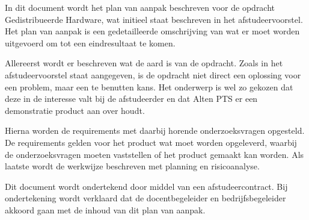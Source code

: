 \documentclass{../local}
\begin{document}
In dit document wordt het plan van aanpak beschreven voor de opdracht Gedistribueerde Hardware, wat initieel staat beschreven in het afstudeervoorstel. Het plan van aanpak is een gedetailleerde omschrijving van wat er moet worden uitgevoerd om tot een eindresultaat te komen.

Allereerst wordt er beschreven wat de aard is van de opdracht. Zoals in het afstudeervoorstel staat aangegeven, is de opdracht niet direct een oplossing voor een problem, maar een te benutten kans. Het onderwerp is wel zo gekozen dat deze in de interesse valt bij de afstudeerder en dat Alten PTS er een demonstratie product aan over houdt. 

Hierna worden de requirements met daarbij horende onderzoeksvragen opgesteld. De requirements gelden voor het product wat moet worden opgeleverd, waarbij de onderzoeksvragen moeten vaststellen of het product gemaakt kan worden. Als laatste wordt de werkwijze beschreven met planning en risicoanalyse.

Dit document wordt ondertekend door middel van een afstudeercontract. Bij ondertekening wordt verklaard dat de docentbegeleider en bedrijfsbegeleider akkoord gaan met de inhoud van dit plan van aanpak.
\end{document}
